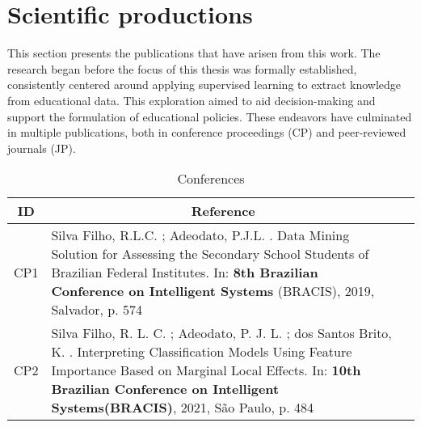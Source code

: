 \section{Scientific productions}
\label{publicacoes}

This section presents the publications that have arisen from this work. The research began before the focus of this thesis was formally established, consistently centered around applying supervised learning to extract knowledge from educational data. This exploration aimed to aid decision-making and support the formulation of educational policies. These endeavors have culminated in multiple publications, both in conference proceedings (CP) and peer-reviewed journals (JP). 


\begin{table}[ht]
\caption{Conferences}
\label{tbl:conferences}
\centering
{}
\begin{tabular}{p{1cm}p{14cm}p{1cm}}
\hline
\multicolumn{1}{c}{\textbf{ID}} & \multicolumn{1}{c}{\textbf{Reference}}\\
\hline     
CP1 & Silva Filho, R.L.C. ; Adeodato, P.J.L. . Data Mining Solution for Assessing the Secondary School Students of Brazilian Federal Institutes. In: \textbf{8th Brazilian Conference on Intelligent Systems} (BRACIS), 2019, Salvador, p. 574
\\ 
CP2 & Silva Filho, R. L. C. ; Adeodato, P. J. L. ; dos Santos Brito, K. . Interpreting Classification Models Using Feature Importance Based on Marginal Local Effects. In: \textbf{10th Brazilian Conference on Intelligent Systems(BRACIS)}, 2021, São Paulo, p. 484
\\ 
\hline
\end{tabular}
\end{table}


